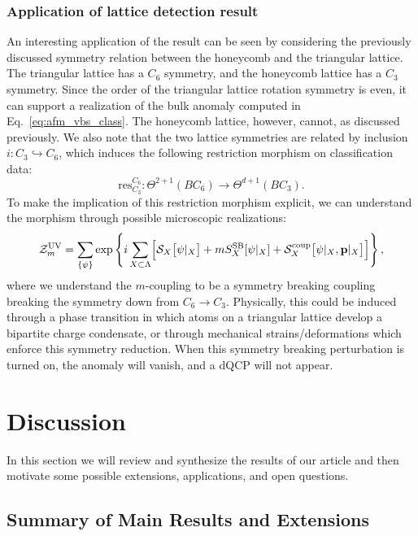 \documentclass[aps,prx,reprint,superscriptaddress,twocolumn,amsmath,amssymb,amsfonts, nofootinbib]{revtex4-2}
\newcommand{\res}{\text{res}}
\theoremstyle{apsstyle}
\begin{document}
\subsubsection{Application of lattice detection result}

An interesting application of the result can be seen by considering the previously discussed symmetry relation between the honeycomb and the triangular lattice. The triangular lattice has a $C_{6}$ symmetry, and the honeycomb lattice has a $C_{3}$ symmetry. Since the order of the triangular lattice rotation symmetry is even, it can support a realization of the bulk anomaly computed in Eq.~\ref{eq:afm_vbs_class}. The honeycomb lattice, however, cannot, as discussed previously. We also note that the two lattice symmetries are related by inclusion $i: C_{3}\hookrightarrow C_{6}$, which induces the following restriction morphism on classification data:
\begin{equation*}
    \res^{C_{6}}_{C_{3}}: \Theta^{2+1}(BC_{6}) \to \Theta^{d+1}(BC_{3}).
\end{equation*}
To make the implication of this restriction morphism explicit, we can understand the morphism through possible microscopic realizations:
\begin{equation*}
    \mathcal{Z}^{\mathrm{UV}}_{m}=\sum_{\{\psi\}} \exp\left\{
      i \sum_{X \subset \Lambda}
      \Bigl[\mathcal S_{X}\bigl[\psi\vert_{X}\bigr]
      + m S^{\mathrm{SB}}_{X}[\psi\vert_{X}] + \mathcal{S}_{X}^{\mathrm{coup}}\bigl[\psi\vert_{X}, {\bf p}\vert_{X}\bigr] \Bigr]
    \right\},
\end{equation*}
where we understand the $m$-coupling to be a symmetry breaking coupling breaking the symmetry down from $C_{6}\to C_{3}$. Physically, this could be induced through a phase transition in which atoms on a triangular lattice develop a bipartite charge condensate, or through mechanical strains/deformations which enforce this symmetry reduction. When this symmetry breaking perturbation is turned on, the anomaly will vanish, and a dQCP will not appear. 


\section{Discussion}
\label{sec:discussion}
In this section we will review and synthesize the results of our article and then motivate some possible extensions, applications, and open questions. 

\subsection{Summary of Main Results and Extensions}
\label{sec:discussion_main_results}
\end{document}
